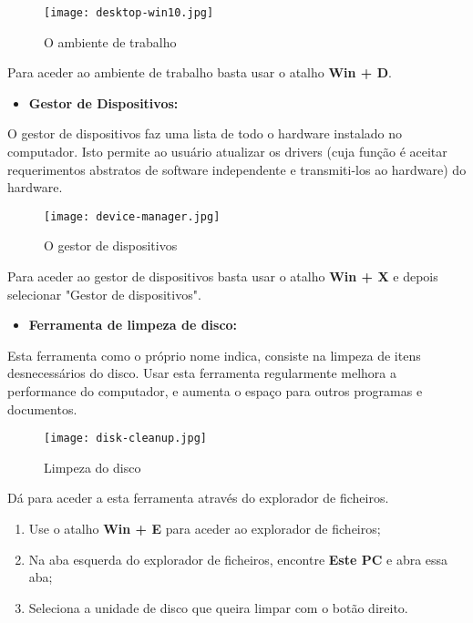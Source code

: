 \documentclass{report}
\begin{document}
\begin{figure}[h!]
\texttt{[image: desktop-win10.jpg]}
\centering
\caption{O ambiente de trabalho}
\end{figure}

Para aceder ao ambiente de trabalho basta usar o atalho \textbf{Win + D}.

\begin{itemize}
    \item \textbf{Gestor de Dispositivos:}
\end{itemize}

O gestor de dispositivos faz uma lista de todo o hardware instalado no computador. Isto permite ao usuário atualizar os drivers (cuja função é aceitar requerimentos abstratos de software independente e transmiti-los ao hardware)  do hardware.

\begin{figure}[h!]
\texttt{[image: device-manager.jpg]}
\centering
\caption{O gestor de dispositivos}
\end{figure}

Para aceder ao gestor de dispositivos basta usar o atalho \textbf{Win + X} e depois selecionar "Gestor de dispositivos".

\begin{itemize}
    \item \textbf{Ferramenta de limpeza de disco:}
\end{itemize}

Esta ferramenta como o próprio nome indica, consiste na limpeza de itens desnecessários do disco. Usar esta ferramenta regularmente melhora a performance do computador, e aumenta o espaço para outros programas e documentos.

\begin{figure}[h!]
\texttt{[image: disk-cleanup.jpg]}
\centering
\caption{Limpeza do disco}
\end{figure}

Dá para aceder a esta ferramenta através do explorador de ficheiros.

\begin{enumerate}
    \item Use o atalho \textbf{Win + E} para aceder ao explorador de ficheiros;
    \item Na aba esquerda do explorador de ficheiros, encontre \textbf{Este PC} e abra essa aba;
    \item Seleciona a unidade de disco que queira limpar com o botão direito.
\end{enumerate}
\end{document}
